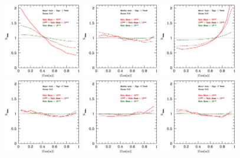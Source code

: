 \documentclass[usenatbib]{mn2e}
\begin{document}
\begin{figure}
\includegraphics[width=0.30\textwidth]{../plot2/Ax1_VT/512_AX1_T1.ps}
\includegraphics[width=0.30\textwidth]{../plot2/Ax2_VT/512_AX2_T1.ps}
\includegraphics[width=0.30\textwidth]{../plot2/Ax3_VT/512_AX3_T1.ps}
\includegraphics[width=0.30\textwidth]{../plot2/Ax1_VT/512_AX1_T2.ps}
\includegraphics[width=0.30\textwidth]{../plot2/Ax2_VT/512_AX2_T2.ps}
\includegraphics[width=0.30\textwidth]{../plot2/Ax3_VT/512_AX3_T2.ps}

\end{figure}
\end{document}
